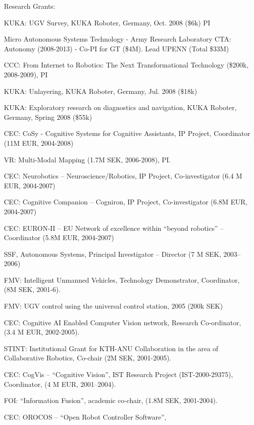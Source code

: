 \documentclass{article}
\begin{document}
\begin{cv}
\begin{cvlist}{Research Grants:}
\item KUKA: UGV Survey, KUKA Roboter, Germany, Oct. 2008 (\$6k)  PI%
\item Micro Autonomous Systems Technology - Army Research Laboratory
  CTA: Autonomy (2008-2013) - Co-PI for GT (\$4M). Lead UPENN (Total \$33M) %
\item CCC: From Internet to Robotics: The Next Transformational
  Technology (\$200k, 2008-2009), PI %
\item KUKA: Unlayering, KUKA Roboter, Germany, Jul. 2008 (\$18k) %
\item KUKA: Exploratory research on diagnostics and navigation, KUKA
  Roboter, Germany, Spring 2008 (\$55k)%
\item CEC: CoSy - Cognitive Systems for Cognitive Assistants, IP
  Project, Coordinator (11M EUR, 2004-2008)
\item VR: Multi-Modal Mapping (1.7M SEK, 2006-2008), PI.%
\item CEC: Neurobotics -- Neuroscience/Robotics, IP Project,
  Co-investigator (6.4 M EUR, 2004-2007)%
\item CEC: Cognitive Companion -- Cogniron, IP Project,
  Co-investigator (6.8M EUR, 2004-2007) %
\item CEC: EURON-II -- EU Network of excellence within ``beyond
  robotics''  -- Coordinator (5.8M EUR, 2004-2007) %
\item SSF, Autonomous Systems, Principal Investigator -- Director  (7
  M SEK, 2003--2006) %
\item FMV: Intelligent Unmanned Vehicles, Technology Demonstrator,
  Coordinator, (8M SEK, 2001-6). %
\item FMV: UGV control using the universal control station, 2005 (200k
  SEK) %
\item CEC: Cognitive AI Enabled Computer Vision network, Research
  Co-ordinator, (3.4 M EUR, 2002-2005). %
\item STINT: Institutional Grant for KTH-ANU Collaboration in the area
  of Collaborative Robotics, Co-chair (2M SEK, 2001-2005).%
\item CEC: CogVis -- ``Cognitive Vision'', IST Research Project
  (IST-2000-29375), Coordinator, (4 M EUR, 2001--2004).%
\item FOI: ``Information Fusion'', academic co-chair,  (1.8M SEK, 2001-2004).%
\item CEC: OROCOS -- ``Open Robot Controller Software'',

\end{cvlist}
\end{cv}
\end{document}
